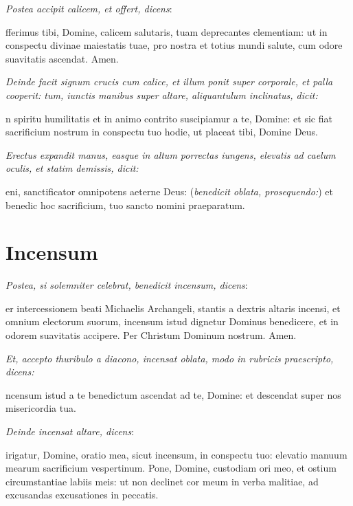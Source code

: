 \divisio

\textit{Postea accipit calicem, et offert, dicens}:

fferimus tibi, Domine, calicem salutaris, tuam deprecantes
clementiam: ut in conspectu divinae maiestatis tuae, pro nostra et totius mundi
salute, cum odore suavitatis ascendat.  Amen.

\textit{%
    Deinde facit signum crucis cum calice, et illum ponit super corporale, et
    palla cooperit: tum, iunctis manibus super altare, aliquantulum inclinatus,
    dicit:
}


n spiritu humilitatis et in animo contrito suscipiamur a te,
Domine: et sic fiat sacrificium nostrum in conspectu tuo hodie, ut placeat tibi,
Domine Deus.

\textit{%
    Erectus expandit manus, easque in altum porrectas iungens, elevatis ad
    caelum oculis, et statim demissis, dicit:
}

eni, sanctificator omnipotens aeterne Deus: (\textit{benedicit
oblata, prosequendo:}) et bene\cross{}dic hoc sacrificium, tuo sancto nomini
praeparatum.

\section{Incensum}

\textit{Postea, si solemniter celebrat, benedicit incensum, dicens}:

er intercessionem beati Michaelis Archangeli, stantis a dextris
altaris incensi, et omnium electorum suorum, incensum istud dignetur Dominus
bene\cross{}dicere, et in odorem suavitatis accipere.  Per Christum Dominum
nostrum.  Amen.

\textit{%
    Et, accepto thuribulo a diacono, incensat oblata, modo in rubricis
    praescripto, dicens:
}

ncensum istud a te benedictum ascendat ad te, Domine: et descendat
super nos misericordia tua.

\textit{Deinde incensat altare, dicens}:


irigatur, Domine, oratio mea, sicut incensum, in conspectu tuo:
elevatio manuum mearum sacrificium vespertinum.  Pone, Domine, custodiam ori
meo, et ostium circumstantiae labiis meis: ut non declinet cor meum in verba
malitiae, ad excusandas excusationes in peccatis.

